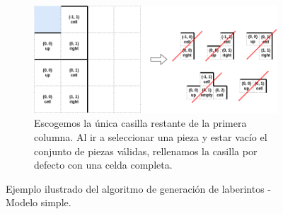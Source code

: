 \begin{figure}[H]
\begin{subfigure}[b]{0.9\textwidth}
        \end{subfigure}
        \par\bigskip
        \begin{subfigure}[b]{0.9\textwidth}
            \centering
            \includegraphics[scale=0.4]{img/paso3.png}
            \caption{Escogemos la única casilla restante de la primera columna. Al ir a seleccionar una pieza y estar vacío el conjunto de piezas válidas, rellenamos la casilla por defecto con una celda completa.}
        \end{subfigure}
        \caption{Ejemplo ilustrado del algoritmo de generación de laberintos - Modelo simple.}
        \label{fig:simple1}
    \end{figure}
    
